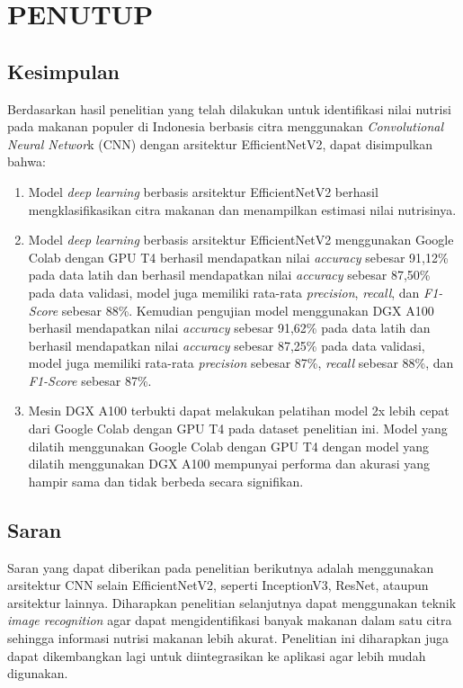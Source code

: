 \chapter{PENUTUP}

\section{Kesimpulan}
Berdasarkan hasil penelitian yang telah dilakukan untuk identifikasi nilai nutrisi pada makanan populer di Indonesia berbasis citra menggunakan \textit{Convolutional Neural Networ}k (CNN) dengan arsitektur EfficientNetV2, dapat disimpulkan bahwa:
\begin{enumerate}
    \item Model \textit{deep learning} berbasis arsitektur EfficientNetV2 berhasil mengklasifikasikan citra makanan dan menampilkan estimasi nilai nutrisinya.
    \item Model \textit{deep learning} berbasis arsitektur EfficientNetV2 menggunakan Google Colab dengan GPU T4 berhasil mendapatkan nilai \textit{accuracy} sebesar 91,12\% pada data latih dan berhasil mendapatkan nilai \textit{accuracy} sebesar 87,50\% pada data validasi, model juga memiliki rata-rata \textit{precision}, \textit{recall}, dan \textit{F1-Score} sebesar 88\%. Kemudian pengujian model menggunakan DGX A100 berhasil mendapatkan nilai \textit{accuracy} sebesar 91,62\% pada data latih dan berhasil mendapatkan nilai \textit{accuracy} sebesar 87,25\% pada data validasi, model juga memiliki rata-rata \textit{precision} sebesar 87\%, \textit{recall} sebesar 88\%, dan \textit{F1-Score} sebesar 87\%.
    \item Mesin DGX A100 terbukti dapat melakukan pelatihan model 2x lebih cepat dari Google Colab dengan GPU T4 pada dataset penelitian ini. Model yang dilatih menggunakan Google Colab dengan GPU T4 dengan model yang dilatih menggunakan DGX A100 mempunyai performa dan akurasi yang hampir sama dan tidak berbeda secara signifikan.
\end{enumerate}

\section{Saran}
Saran yang dapat diberikan pada penelitian berikutnya adalah menggunakan arsitektur CNN selain EfficientNetV2, seperti InceptionV3, ResNet, ataupun arsitektur lainnya. Diharapkan penelitian selanjutnya dapat menggunakan teknik \textit{image recognition} agar dapat mengidentifikasi banyak makanan dalam satu citra sehingga informasi nutrisi makanan lebih akurat. Penelitian ini diharapkan juga dapat dikembangkan lagi untuk diintegrasikan ke aplikasi agar lebih mudah digunakan.
